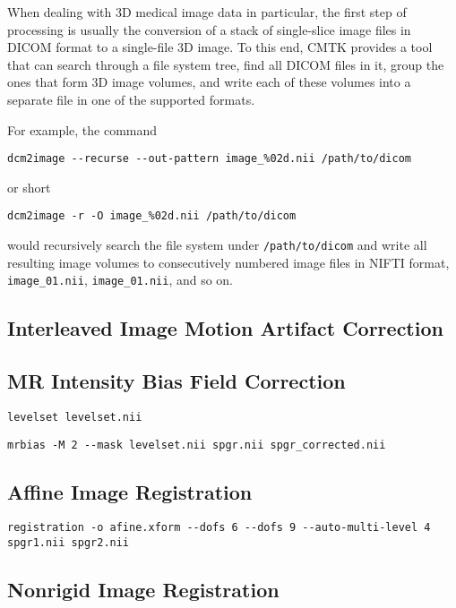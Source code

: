 \documentclass{InsightArticle}
\begin{document}
When dealing with 3D medical image data in particular, the first step of
processing is usually the conversion of a stack of single-slice image files in
DICOM format to a single-file 3D image. To this end, CMTK provides a tool that
can search through a file system tree, find all DICOM files in it, group the
ones that form 3D image volumes, and write each of these volumes into a
separate file in one of the supported formats.

For example, the command
\begin{verbatim}
dcm2image --recurse --out-pattern image_%02d.nii /path/to/dicom
\end{verbatim}
or short
\begin{verbatim}
dcm2image -r -O image_%02d.nii /path/to/dicom
\end{verbatim}
would recursively search the file system under {\tt /path/to/dicom} and write
all resulting image volumes to consecutively numbered image files in NIFTI
format, {\tt image\_01.nii},  {\tt image\_01.nii}, and so on.

\subsection{Interleaved Image Motion Artifact Correction}

\subsection{MR Intensity Bias Field Correction}

\begin{verbatim}
levelset levelset.nii
\end{verbatim}

\begin{verbatim}
mrbias -M 2 --mask levelset.nii spgr.nii spgr_corrected.nii
\end{verbatim}

\subsection{Affine Image Registration}


\begin{verbatim}
registration -o afine.xform --dofs 6 --dofs 9 --auto-multi-level 4 spgr1.nii spgr2.nii
\end{verbatim}

\subsection{Nonrigid Image Registration}
\end{document}
